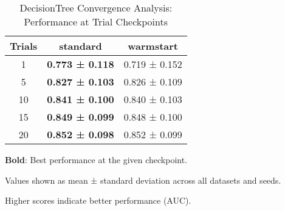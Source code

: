 \begin{table}[htbp]
\centering
\caption{DecisionTree Convergence Analysis: Performance at Trial Checkpoints}
\label{tab:decisiontree_convergence}
\begin{tabular}{ccc}
\toprule
Trials & standard & warmstart \\
\midrule
1 & \textbf{0.773 ± 0.118} & 0.719 ± 0.152 \\
5 & \textbf{0.827 ± 0.103} & 0.826 ± 0.109 \\
10 & \textbf{0.841 ± 0.100} & 0.840 ± 0.103 \\
15 & \textbf{0.849 ± 0.099} & 0.848 ± 0.100 \\
20 & \textbf{0.852 ± 0.098} & 0.852 ± 0.099 \\
\bottomrule
\end{tabular}
\begin{tablenotes}
\small
\item \textbf{Bold}: Best performance at the given checkpoint.
\item Values shown as mean ± standard deviation across all datasets and seeds.
\item Higher scores indicate better performance (AUC).
\end{tablenotes}
\end{table}
